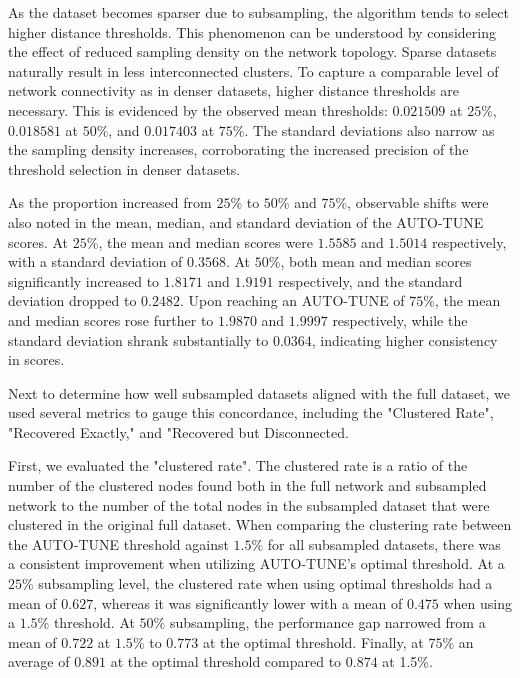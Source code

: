 \documentclass[utf8]{FrontiersinHarvard} %
\begin{document}
As the dataset becomes sparser due to subsampling, the algorithm tends to
select higher distance thresholds. This phenomenon can be understood by
considering the effect of reduced sampling density on the network topology.
Sparse datasets naturally result in less interconnected clusters. To capture a
comparable level of network connectivity as in denser datasets, higher distance
thresholds are necessary. This is evidenced by the observed mean thresholds:
\(0.021509\) at \(25\%\), \(0.018581\) at \(50\%\), and \(0.017403\) at
\(75\%\). The standard deviations also narrow as the sampling density
increases, corroborating the increased precision of the threshold selection in
denser datasets.

As the proportion increased from $25\%$ to $50\%$ and $75\%$, observable shifts
were also noted in the mean, median, and standard deviation of the AUTO-TUNE
scores. At $25\%$, the mean and median scores were $1.5585$ and $1.5014$
respectively, with a standard deviation of $0.3568$. At $50\%$, both mean and
median scores significantly increased to $1.8171$ and $1.9191$ respectively,
and the standard deviation dropped to $0.2482$. Upon reaching an AUTO-TUNE of
$75\%$, the mean and median scores rose further to $1.9870$ and $1.9997$
respectively, while the standard deviation shrank substantially to $0.0364$,
indicating higher consistency in scores.

Next to determine how well subsampled datasets aligned with the full dataset,
we used several metrics to gauge this concordance, including the "Clustered
Rate", "Recovered Exactly," and "Recovered but Disconnected.

First, we evaluated the "clustered rate". The clustered rate is a ratio of the
number of the clustered nodes found both in the full network and subsampled
network to the number of the total nodes in the subsampled dataset that were
clustered in the original full dataset. When comparing the clustering rate
between the AUTO-TUNE threshold against $1.5\%$ for all subsampled datasets,
there was a consistent improvement when utilizing AUTO-TUNE's optimal
threshold. At a $25\%$ subsampling level, the clustered rate when using optimal
thresholds had a mean of $0.627$, whereas it was significantly lower with a
mean of $0.475$ when using a $1.5\%$ threshold. At $50\%$ subsampling, the
performance gap narrowed from a mean of $0.722$ at $1.5\%$ to $0.773$ at the
optimal threshold. Finally, at $75\%$ an average of $0.891$ at the optimal
threshold compared to $0.874$ at 1.5\%.
\end{document}
